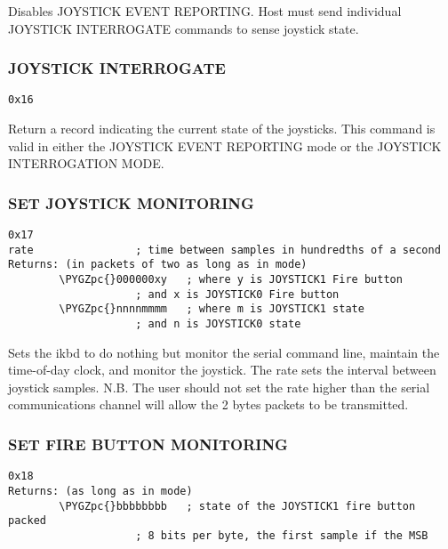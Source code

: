 \documentclass[a4paper,8pt,english]{sphinxmanual}
\def\PYGZpc{\char`\%}
\begin{document}
Disables JOYSTICK EVENT REPORTING. Host must send individual JOYSTICK
INTERROGATE commands to sense joystick state.


\subsubsection{JOYSTICK INTERROGATE}
\label{input/devices/atarikbd:joystick-interrogate}
\begin{Verbatim}[commandchars=\\\{\}]
0x16
\end{Verbatim}

Return a record indicating the current state of the joysticks. This command
is valid in either the JOYSTICK EVENT REPORTING mode or the JOYSTICK
INTERROGATION MODE.


\subsubsection{SET JOYSTICK MONITORING}
\label{input/devices/atarikbd:set-joystick-monitoring}
\begin{Verbatim}[commandchars=\\\{\}]
0x17
rate                ; time between samples in hundredths of a second
Returns: (in packets of two as long as in mode)
        \PYGZpc{}000000xy   ; where y is JOYSTICK1 Fire button
                    ; and x is JOYSTICK0 Fire button
        \PYGZpc{}nnnnmmmm   ; where m is JOYSTICK1 state
                    ; and n is JOYSTICK0 state
\end{Verbatim}

Sets the ikbd to do nothing but monitor the serial command line, maintain the
time-of-day clock, and monitor the joystick. The rate sets the interval
between joystick samples.
N.B. The user should not set the rate higher than the serial communications
channel will allow the 2 bytes packets to be transmitted.


\subsubsection{SET FIRE BUTTON MONITORING}
\label{input/devices/atarikbd:set-fire-button-monitoring}
\begin{Verbatim}[commandchars=\\\{\}]
0x18
Returns: (as long as in mode)
        \PYGZpc{}bbbbbbbb   ; state of the JOYSTICK1 fire button packed
                    ; 8 bits per byte, the first sample if the MSB
\end{Verbatim}
\end{document}
